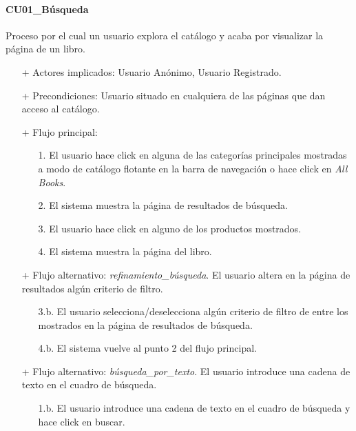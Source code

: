 \documentclass[a4paper]{article}
\begin{document}
            \paragraph{CU01\_Búsqueda}
            Proceso por el cual un usuario explora el catálogo y acaba por visualizar la página de un libro.
            \begin{itemize}
                \item[+] Actores implicados: Usuario Anónimo, Usuario Registrado.
                \item[+] Precondiciones: Usuario situado en cualquiera de las páginas que dan acceso al catálogo.
                \item[+] Flujo principal:
                \begin{enumerate}
                    \item[1.] El usuario hace click en alguna de las categorías principales mostradas a modo de catálogo flotante en la barra de navegación
                    o hace click en \emph{All Books}.
                    \item[2.] El sistema muestra la página de resultados de búsqueda.
                    \item[3.] El usuario hace click en alguno de los productos mostrados.
                    \item[4.] El sistema muestra la página del libro.
                \end{enumerate}
                \item[+] Flujo alternativo: \emph{refinamiento\_búsqueda}. El usuario altera en la página de resultados algún criterio de filtro.
                \begin{itemize}
                    \item[3.b.] El usuario selecciona/deselecciona algún criterio de filtro de entre los mostrados en la página de resultados de búsqueda.
                    \item[4.b.] El sistema vuelve al punto 2 del flujo principal.
                \end{itemize}
                \item[+] Flujo alternativo: \emph{búsqueda\_por\_texto}. El usuario introduce una cadena de texto en el cuadro de búsqueda.
                \begin{itemize}
                    \item[1.b.] El usuario introduce una cadena de texto en el cuadro de búsqueda y hace click en buscar.
                \end{itemize}
            \end{itemize}
\end{document}
